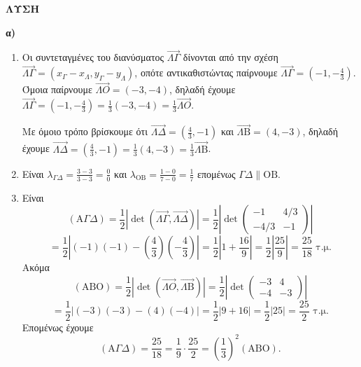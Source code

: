 \textbf{ΛΥΣΗ}

\textbf{α)}
\begin{enumerate}
    \item Οι συντεταγμένες του διανύσματος $\vec{\Lambda\Gamma}$ δίνονται από την σχέση $\vec{\Lambda\Gamma} = (x_\Gamma - x_\Lambda, y_\Gamma - y_\Lambda)$, οπότε αντικαθιστώντας παίρνουμε $\vec{\Lambda\Gamma} = \left(-1, -\frac{4}{3}\right)$. Όμοια παίρνουμε $\vec{\Lambda O} = (-3, -4)$, δηλαδή έχουμε $\vec{\Lambda\Gamma} = \left(-1, -\frac{4}{3}\right) = \frac{1}{3}(-3, -4) = \frac{1}{3}\vec{\Lambda O}$.

    Με όμοιο τρόπο βρίσκουμε ότι $\vec{\Lambda\Delta} = \left(\frac{4}{3}, -1\right)$ και $\vec{\Lambda\mathrm{B}} = (4, -3)$, δηλαδή έχουμε $\vec{\Lambda\Delta} = \left(\frac{4}{3}, -1\right) = \frac{1}{3}(4, -3) = \frac{1}{3}\vec{\Lambda\mathrm{B}}$.

    \item Είναι $\lambda_{\Gamma\Delta} = \frac{3-3}{3-3} = \frac{0}{0}$ και $\lambda_{\mathrm{OB}} = \frac{1-0}{7-0} = \frac{1}{7}$ επομένως $\Gamma\Delta \parallel \mathrm{OB}$.

    \item Είναι
    \[
    (\mathrm{A}\Gamma\Delta) = \frac{1}{2}\left|\det(\vec{\Lambda\Gamma}, \vec{\Lambda\Delta})\right| = \frac{1}{2}\left|\det\begin{pmatrix} -1 & 4/3 \\ -4/3 & -1 \end{pmatrix}\right|
    \]
    \[
    = \frac{1}{2}\left|\left(-1\right)\left(-1\right) - \left(\frac{4}{3}\right)\left(-\frac{4}{3}\right)\right| = \frac{1}{2}\left|1 + \frac{16}{9}\right| = \frac{1}{2}\left|\frac{25}{9}\right| = \frac{25}{18} \text{ τ.μ.}
    \]
    Ακόμα
    \[
    (\mathrm{ABO}) = \frac{1}{2}\left|\det(\vec{\Lambda O}, \vec{\Lambda\mathrm{B}})\right| = \frac{1}{2}\left|\det\begin{pmatrix} -3 & 4 \\ -4 & -3 \end{pmatrix}\right|
    \]
    \[
    = \frac{1}{2}\left|(-3)(-3) - (4)(-4)\right| = \frac{1}{2}\left|9 + 16\right| = \frac{1}{2}\left|25\right| = \frac{25}{2} \text{ τ.μ.}
    \]
    Επομένως έχουμε
    \[
    (\mathrm{A}\Gamma\Delta) = \frac{25}{18} = \frac{1}{9} \cdot \frac{25}{2} = \left(\frac{1}{3}\right)^2 (\mathrm{ABO}).
    \]
\end{enumerate}

